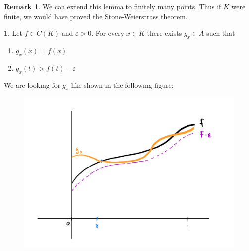 \documentclass[11pt]{article}
\numberwithin{equation}{section}
\theoremstyle{definition}
\newtheorem{claim}{\color{ForestGreen}{\textbf{Claim}}}[section]
\theoremstyle{definition}
\newtheorem*{remark}{Remark}
\newcommand{\1}{\mathbbm 1}
\newcommand{\e}{\varepsilon}
\begin{document}
\begin{remark}
	We can extend this lemma to finitely many points. Thus if $K$ were finite, we would have proved the Stone-Weierstrass theorem. 
\end{remark}

\begin{claim}
	Let $f \in C(K)$ and $\e > 0$. For every $x \in K$ there exists $g_x \in \bar{A}$ such that 
	\begin{enumerate}
		\item $g_x(x) = f(x)$
		\item $g_x(t) > f(t) - \e$
	\end{enumerate}
\end{claim}

We are looking for $g_x$ like shown in the following figure:
\begin{figure}[H]
	\begin{center}
		\includegraphics[scale=.5]{weierstrass.png}
	\end{center}
\end{figure}
\end{document}
